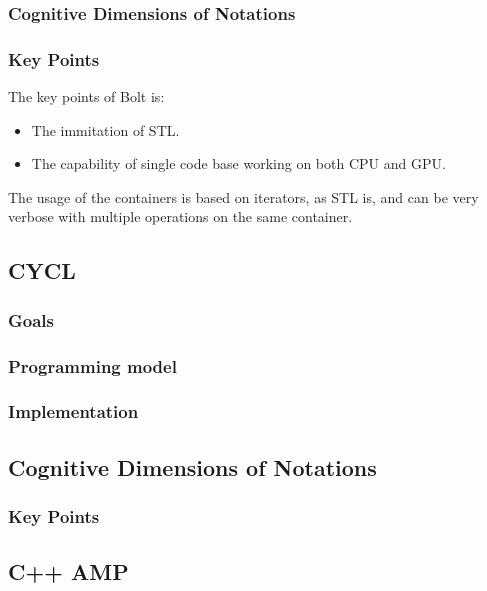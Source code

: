 \subsubsection{Cognitive Dimensions of Notations}

\subsubsection{Key Points}
The key points of Bolt is:

\begin{itemize}
\item The immitation of STL.
\item The capability of single code base working on both CPU and GPU.
\end{itemize}

The usage of the containers is based on iterators, as STL is, and can be very verbose with multiple operations on the same container.


\subsection{CYCL}

\subsubsection{Goals}

\subsubsection{Programming model}

\subsubsection{Implementation}

\subsection{Cognitive Dimensions of Notations}

\subsubsection{Key Points}


\subsection{C++ AMP}

